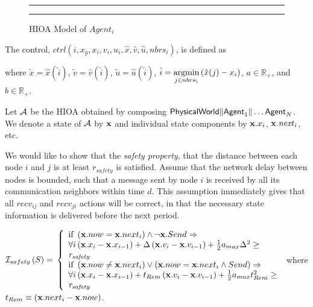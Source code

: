 \documentclass[10pt, conference, compsocconf]{IEEEtran}
\begin{document}
\begin{figure}[h!]
\centering
  \hrule
  {}
  \hrule
  \caption{HIOA Model of $Agent_i$}
  \label{fig:agent_i}
\end{figure}

The control, $ctrl(i, x_g, x_i, v_i, u_i, \hat{x}, \hat{v}, \hat{u}, nbrs_i)$, is defined as

where $\tilde{x} = \hat{x}(\tilde{i})$, $\tilde{v} = \hat{v}(\tilde{i})$, $\tilde{u} = \hat{u}(\tilde{i})$, $\tilde{i} = \argmin{\left(\hat{x}(j) - x_i\right)}{j \in nbrs_i}$, $a \in \mathbb{R}_+$, and $b \in \mathbb{R}_+$.

Let $\A$ be the HIOA obtained by composing $\auto{PhysicalWorld} \| \auto{Agent}_1 \| \ldots \auto{Agent}_N$.  We denote a state of $\A$ by $\vx$ and individual state components by $\vx.x_i$, $\vx.\mathit{next}_i$, etc.
%

We would like to show that the \textit{safety property}, that the distance between each node $i$ and $j$ is at least $\mathit{r_{safety}}$ is satisfied.  Assume that the network delay between nodes is bounded, such that a message sent by node $i$ is received by all its communication neighbors within time $d$.  This assumption immediately gives that all $recv_{ij}$ and $recv_{ji}$ actions will be correct, in that the necessary state information is delivered before the next period.

\begin{inv}
$\I_{safety}\left(S\right) = \\
	\left\{ \begin{array}{l}
		\textrm{if } \left( \vx.now = \vx.next_i \right) \wedge \neg \vx.Send \Rightarrow \\
		\forall i \left(\vx.x_{i} - \vx.x_{i-1}\right) + \Delta\left(\vx.v_{i} - \vx.v_{i-1}\right) + \frac{1}{2}a_{max}\Delta^2 \geq \\ \mathit{r_{safety}} \\
		\textrm{if } \left( \vx.now \neq \vx.next_i \right) \vee \left( \vx.now = \vx.next_i \wedge Send \right) \Rightarrow \\
		\forall i \left(\vx.x_{i} - \vx.x_{i-1}\right) + t_{Rem}\left(\vx.v_{i} - \vx.v_{i-1}\right) + \frac{1}{2}a_{max}t_{Rem}^2 \geq \\  \mathit{r_{safety}} \\
	\end{array}
\right.$ where $t_{Rem} \equiv \left(\vx.next_i - \vx.now\right)$.
\end{inv}
\end{document}
